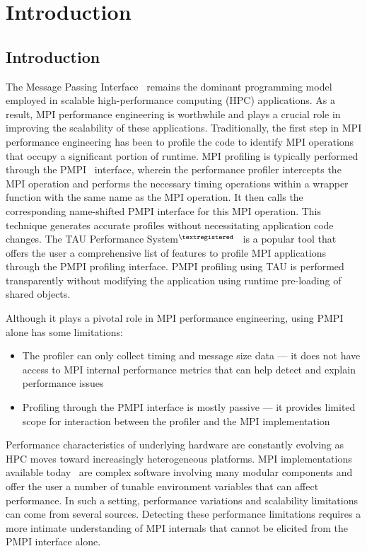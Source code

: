 \chapter{Introduction}

\section {Introduction}

The Message Passing Interface~\cite{MPI_3_1} remains the dominant programming model employed in scalable high-performance computing (HPC) applications. As a result, MPI performance engineering is worthwhile and plays a crucial role in improving the scalability of these applications. Traditionally, the first step in MPI performance engineering has been to profile the code to identify MPI operations that occupy a significant portion of runtime. MPI profiling is typically performed through the PMPI~\cite{PMPI} interface, wherein the performance profiler intercepts the MPI operation and performs the necessary timing operations within a wrapper function with the same name as the MPI operation. It then calls the corresponding name-shifted PMPI interface for this MPI operation. This technique generates accurate profiles without necessitating application code changes. The TAU Performance System$^{\textregistered}$~\cite{Shende:2006:TPP:1125980.1125982} is a popular tool that offers the user a comprehensive list of features to profile MPI applications through the PMPI profiling interface. PMPI profiling using TAU is performed transparently without modifying the application using runtime pre-loading of shared objects. \par
Although it plays a pivotal role in MPI performance engineering, using PMPI alone has some limitations:
\begin{itemize}
\item The profiler can only collect timing and message size data --- it does not have access to MPI internal performance metrics that can help detect and explain performance issues
\item Profiling through the PMPI interface is mostly passive --- it provides limited scope for interaction between the profiler and the MPI implementation
\end{itemize}
\par Performance characteristics of underlying hardware are constantly evolving as HPC moves toward increasingly heterogeneous platforms. MPI implementations available today~\cite{MVAPICH2,OpenMPI,MPICH,pjn2008} are complex software involving many modular components and offer the user a number of tunable environment variables that can affect performance. In such a setting, performance variations and scalability limitations can come from several sources. Detecting these performance limitations requires a more intimate understanding of MPI internals that cannot be elicited from the PMPI interface alone. \par
